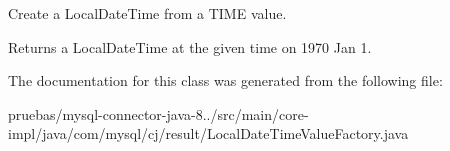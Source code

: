 Create a Local\+Date\+Time from a T\+I\+ME value.

\begin{DoxyReturn}{Returns}
a Local\+Date\+Time at the given time on 1970 Jan 1. 
\end{DoxyReturn}


The documentation for this class was generated from the following file\+:\begin{DoxyCompactItemize}
\item 
pruebas/mysql-\/connector-\/java-\/8../src/main/core-\/impl/java/com/mysql/cj/result/Local\+Date\+Time\+Value\+Factory.\+java\end{DoxyCompactItemize}
